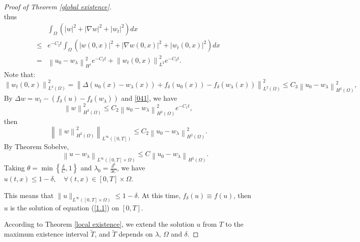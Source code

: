 \documentclass{article}
\numberwithin{equation}{section}
\begin{document}
\begin{proof}[Proof of Theorem \ref{global existence}]
\begin{equation*}
\end{equation*}
thus
\begin{equation}
\begin{aligned}
&\int_{\Omega}\left(\left|w\right|^{2}+|\nabla w|^{2}+| w_t|^{2}\right)  d x
\\ \le & e^{-C_2t}\int_{\Omega}\left(\left|w(0, x)\right|^{2}+|\nabla w(0, x)|^{2}+| w_t(0, x)|^{2}\right)  d x
\\=&\left\|u_{0}-w_{\lambda}\right\|_{H^{1}}^2e^{-C_2t}+\left\|w_t(0, x)\right\|_{L^{2}}^2e^{-C_2t}.
\end{aligned} \label{041}
\end{equation}
Note that:
\begin{equation*}
\left\|w_t(0, x)\right\|_{L^{2}(\Omega)}^2=\left\|\Delta\left(u_{0}(x)
-w_{\lambda}(x)\right)+f_{\delta}(u_0(x))-f_{\delta}
\left(w_{\lambda}(x)\right)\right\|_{L^{2}(\Omega)}^2\le C_3\left\|u_{0}-w_{\lambda}\right\|_{H^{2}(\Omega)}^2,
\end{equation*}
By $\Delta w=w_t-\left(f_{\delta}(u)-f_{\delta}
\left(w_{\lambda}\right)\right)$ and \eqref{041}, we have
\begin{equation}
\left\|w\right\|_{H^{2}(\Omega)}^2
\le C_2\left\|u_{0}-w_{\lambda}\right\|_{H^{2}(\Omega)}^2 e^{-C_1t},
\label{042}
\end{equation}
then
\begin{equation}
\left\|\left\|w\right\|_{H^{2}(\Omega)}^2\right\|_{L^{\infty}([0, T])}
\le C_2\left\|u_{0}-w_{\lambda}\right\|_{H^{2}(\Omega)}^2 . \label{043}
\end{equation}
By Theorem Sobelve,
\begin{equation}
\qquad\left\|u-w_{\lambda}\right\|_{L^{\infty}([0, T] \times \Omega)} \le C\left\|u_{0}-w_{\lambda}\right\|_{H^{2}(\Omega)}.\label{044}
\end{equation}
Taking $\theta=\min \left\{\frac{\delta}{C}, 1\right\}$ and $ \lambda_{0}= \frac{\delta^{6}}{3 C} $, we have $u(t, x) \le 1-\delta ,\quad \forall (t, x) \in[0, T] \times \Omega$.

This means that $\|u\|_{L^{\infty}([0, T] \times \Omega)} \le 1-\delta$. At this time, $f_\delta(u)\equiv f(u)$, then $u$ is the solution of equation (\ref{1.1}) on $[0, T]$.

According to Theorem \ref{local existence}, we extend the solution $u$ from $T$  to the maximum existence interval $\widetilde{T}$, and $\widetilde{T}$ depends on $\lambda$, $\Omega$ and $\delta $.


\end{proof}
\end{document}
